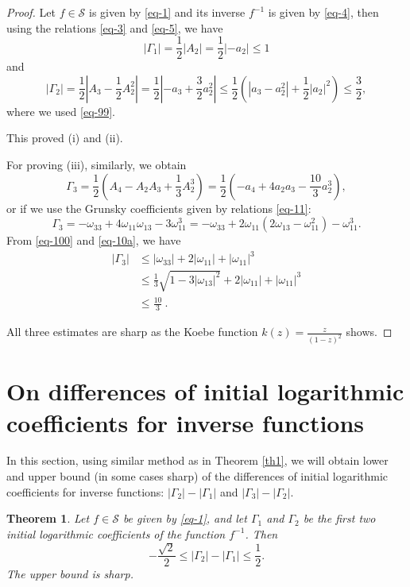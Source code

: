 \documentclass{amsart}
\newtheorem{thm}{Theorem}
\begin{document}
\begin{proof}
Let $f\in\mathcal{S}$ is given by \eqref{eq-1} and its inverse $f^{-1}$ is given by \eqref{eq-4}, then using the relations \eqref{eq-3} and \eqref{eq-5}, we have
\[ |\Gamma_{1}|=\frac{1}{2}|A_{2}|=\frac{1}{2}|-a_{2}|\leq 1\]
and
\[|\Gamma_{2}|=\frac{1}{2}|A_{3}-\frac{1}{2}A_{2}^{2}|=\frac{1}{2}|-a_{3}+\frac{3}{2}a_{2}^{2}|
\leq \frac{1}{2}(|a_{3}-a_{2}^{2}|+\frac{1}{2}|a_{2}|^{2})\leq\frac{3}{2},\]
where we used \eqref{eq-99}.

\medskip

This proved (i) and (ii).

\medskip

For proving (iii), similarly, we obtain
\[
\Gamma_{3}=\frac{1}{2}\left( A_4-A_2A_3+\frac{1}{3}A_2^3\right)=\frac{1}{2}\left(-a_{4}+4a_{2}a_{3}-\frac{10}{3}a_{2}^{3}\right),
\]
or if we use the Grunsky coefficients given by relations \eqref{eq-11}:
\[\Gamma_{3} = -\omega_{33}+4\omega_{11}\omega_{13}-3\omega_{11}^{3} =-\omega_{33}+2\omega_{11}(2\omega_{13}-\omega_{11}^2)-\omega_{11}^{3}.\]
From \eqref{eq-100} and \eqref{eq-10a}, we have
\[
\begin{split}
|\Gamma_{3}| &\leq |\omega_{33}|+2|\omega_{11}|+|\omega_{11}|^{3} \\
&\leq \frac13\sqrt{1-3|\omega_{13}|^2}+2|\omega_{11}|+|\omega_{11}|^{3} \\
&\leq \frac{10}{3}\ .
\end{split}
\]

\medskip

All three estimates are sharp as the Koebe function $k(z)=\frac{z}{(1-z)^{2}}$ shows.
\end{proof}

\medskip

\section{On differences of initial logarithmic coefficients for inverse functions}

\medskip

In this section, using similar method as in Theorem \ref{th1}, we will obtain lower and upper bound (in some cases sharp) of the differences of initial logarithmic coefficients for inverse functions: $|\Gamma_{2}|-|\Gamma_{1}|$ and $|\Gamma_{3}|-|\Gamma_{2}|$.

\medskip

\begin{thm}\label{th2}
Let $f\in\mathcal{S}$ be given by \eqref{eq-1}, and let $\Gamma_{1}$ and $\Gamma_{2}$
be the first two initial logarithmic coefficients of the function $f^{-1}$. Then
$$-\frac{\sqrt{2}}{2}\leq |\Gamma_{2}|-|\Gamma_{1}|\leq \frac{1}{2}.$$
The upper bound is sharp.
\end{thm}
\end{document}
